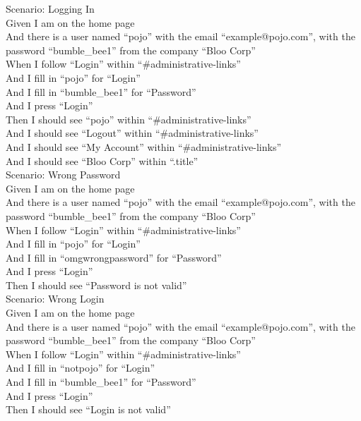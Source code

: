 \documentclass[12pt]{article}
\begin{document}
Scenario: Logging In \\
Given I am on the home page \\
And there is a user named ``pojo'' with the email ``example@pojo.com'', with the password ``bumble\_bee1'' from the company ``Bloo Corp'' \\
When I follow ``Login'' within ``\#administrative-links'' \\
And I fill in ``pojo'' for ``Login'' \\
And I fill in ``bumble\_bee1'' for ``Password'' \\
And I press ``Login'' \\
Then I should see ``pojo'' within ``\#administrative-links'' \\
And I should see ``Logout'' within ``\#administrative-links'' \\
And I should see ``My Account'' within ``\#administrative-links'' \\
And I should see ``Bloo Corp'' within ``.title'' \\

Scenario: Wrong Password \\
  Given I am on the home page \\
  And there is a user named ``pojo'' with the email ``example@pojo.com'', with the password ``bumble\_bee1'' from the company ``Bloo Corp'' \\
  When I follow ``Login'' within ``\#administrative-links'' \\
  And I fill in ``pojo'' for ``Login'' \\
  And I fill in ``omgwrongpassword'' for ``Password'' \\
  And I press ``Login'' \\
  Then I should see ``Password is not valid'' \\

Scenario: Wrong Login \\
  Given I am on the home page \\
  And there is a user named ``pojo'' with the email ``example@pojo.com'', with the password ``bumble\_bee1'' from the company ``Bloo Corp'' \\
  When I follow ``Login'' within ``\#administrative-links'' \\
  And I fill in ``notpojo'' for ``Login'' \\
  And I fill in ``bumble\_bee1'' for ``Password'' \\
  And I press ``Login'' \\
  Then I should see ``Login is not valid'' \\
\end{document}
